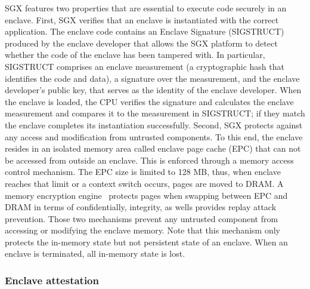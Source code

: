 \documentclass[11pt]{article}
\theoremstyle{plain-boldhead}
\theoremstyle{definition-boldhead}
\begin{document}
\ac{SGX} features two properties that are essential to execute code securely in an
enclave.
% 
First, \ac{SGX} verifies that an enclave is instantiated with the correct
application.
% 
The enclave code contains an Enclave Signature (SIGSTRUCT)
produced by the enclave developer that allows the \ac{SGX} platform to detect
whether the code of the enclave has been tampered with.  In particular,
SIGSTRUCT comprises an enclave measurement (a cryptographic hash that
identifies the code and data), a signature over the measurement, and the enclave developer's public key, that
serves as the identity of the enclave developer.  When the enclave is loaded,
the CPU verifies the signature and calculates the enclave measurement and compares it to the measurement
in SIGSTRUCT; if they match the enclave completes its instantiation
successfully.
% 
Second, \ac{SGX} protects against any access and modification from untrusted
components.
% 
To this end, the enclave resides in an isolated memory area called enclave
page cache (EPC) that can not be accessed from outside an enclave.  This is
enforced through a memory access control mechanism.  The EPC size is limited
to 128 MB, thus, when enclave reaches that limit or a context switch occurs,
pages are moved to DRAM.  A memory encryption engine~\cite{gueron16}
protects pages when swapping between EPC and DRAM in terms of confidentially,
integrity, as wells provides replay attack prevention.
%
Those two mechanisms prevent any untrusted component from accessing or
modifying the enclave memory.
% 
Note that this mechanism only protects the in-memory state but not persistent
state of an enclave.  When an enclave is terminated, all in-memory state is
lost.

 
\subsubsection{Enclave attestation}
\end{document}
